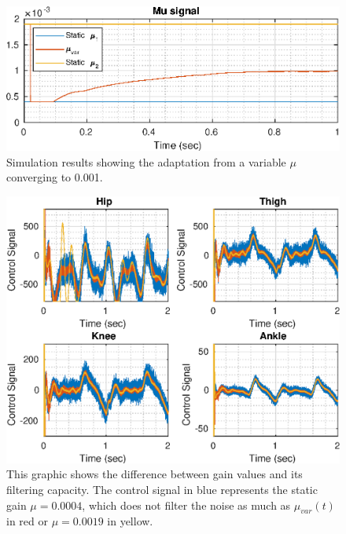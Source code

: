\documentclass[letterpaper, 10 pt, conference]{ieeeconf}  %
\theoremstyle{plain}
\theoremstyle{definition}
\theoremstyle{remark}
\begin{document}
%
\begin{figure}[]
	\begin{center}
	\includegraphics[width = \columnwidth]{Figs/mu_comparison.eps}
	\caption{Simulation results showing the adaptation from a variable $\mu$ converging to 0.001.}
	\label{fig:mu_comparison}
	\end{center}
\end{figure}
%
%
\begin{figure}[]
	\begin{center}
	\includegraphics[width = \columnwidth]{Figs/u_comparison.eps}
	\caption{This graphic shows the difference between gain values and its filtering capacity. The control signal in blue represents the static gain $\mu = 0.0004$, which does not filter the noise as much as $\mu_{var}(t)$ in red or $\mu = 0.0019$ in yellow.}
	\label{fig:u_comparison}
	\end{center}
\end{figure}
%
%
\end{document}
